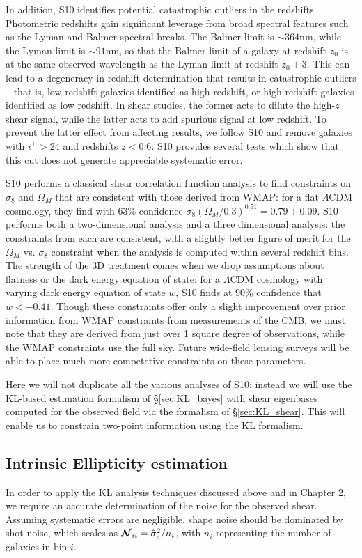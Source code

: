 In addition, S10 identifies potential catastrophic outliers in the redshifts.
Photometric redshifts gain significant leverage from broad spectral features
such as the Lyman and Balmer spectral breaks.  The Balmer limit is
$\sim 364$nm, while the Lyman limit is $\sim 91$nm, so that the Balmer limit
of a galaxy at redshift $z_0$ is at the same observed wavelength as the
Lyman limit at redshift $z_0 + 3$.  This can lead to a degeneracy in redshift
determination that results in catastrophic outliers -- that is, low redshift
galaxies identified as high redshift, or high redshift galaxies identified as
low redshift.  In shear studies, the former acts to dilute the high-$z$
shear signal,
while the latter acts to add spurious signal at low redshift.  To prevent
the latter effect from affecting results, we follow S10 and remove galaxies
with $i^+ > 24$ and redshifts $z < 0.6$.  S10 provides several tests which
show that this cut does not generate appreciable systematic error.

S10 performs a classical shear correlation function analysis to find
constraints on $\sigma_8$ and $\Omega_M$ that are consistent with
those derived from WMAP: for a flat $\Lambda$CDM cosmology, they
find with 63\% confidence 
$\sigma_8(\Omega_M / 0.3)^{0.51} = 0.79 \pm 0.09$.  S10 performs both a
two-dimensional analysis and a three dimensional analysis: the constraints
from each are consistent, with a slightly better figure of merit for the
$\Omega_M$ vs. $\sigma_8$ constraint when the analysis is computed within
several redshift bins.  The strength of the
3D treatment comes when we drop assumptions about flatness or the dark
energy equation of state: for a
$\Lambda$CDM cosmology with varying dark energy equation of state $w$,
S10 finds at 90\% confidence that $w < -0.41$.
Though these constraints offer only a slight improvement over prior
information from WMAP constraints from measurements of the CMB, we must
note that they are derived from just over
1 square degree of observations, while the
WMAP constraints use the full sky.  Future wide-field
lensing surveys will be able to place much more competetive constraints
on these parameters.

Here we will not duplicate all the various analyses of S10: instead we
will use the KL-based estimation formalism of \S\ref{sec:KL_bayes} with
shear eigenbases computed for the observed field via the formalism
of \S\ref{sec:KL_shear}.  This will enable us to constrain two-point
information using the KL formalism.

\subsection{Intrinsic Ellipticity estimation}
\label{sec:bootstrap}
In order to apply the KL analysis techniques discussed
above and in Chapter 2, we require an accurate
determination of the noise for the observed shear.  Assuming systematic
errors are negligible, shape noise should be dominated by shot noise,
which scales as $\boldsymbol{\mathcal{N}}_{ii} = \hat{\sigma}_\epsilon^2 / n_i$,
with $n_i$ representing the number of galaxies in bin $i$.

